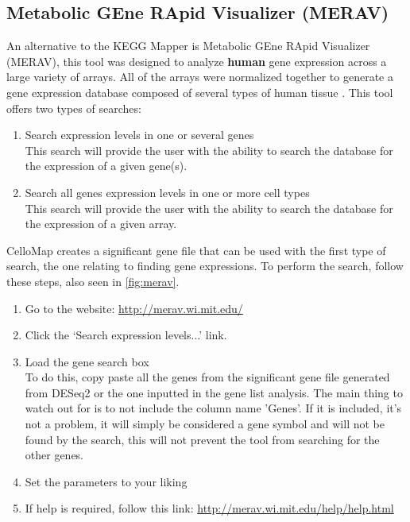 \documentclass[11pt]{article}
\begin{document}
\subsection{Metabolic GEne RApid Visualizer (MERAV)\label{MERAV}}
An alternative to the KEGG Mapper is Metabolic GEne RApid Visualizer (MERAV), this tool was designed to analyze \textbf{human} gene expression across a large variety of arrays. All of the arrays were normalized together to generate a gene expression database composed of several types of human tissue \cite{shaul2015merav}.
This tool offers two types of searches:
\begin{enumerate}
\item Search expression levels in one or several genes\\
This search will provide the user with the ability to search the database for the expression of a given gene(s).
\item Search all genes expression levels in one or more cell types\\
This search will provide the user with the ability to search the database for the expression of a given array.
\end{enumerate}

CelloMap creates a significant gene file that can be used with the first type of search, the one relating to finding gene expressions. To perform the search, follow these steps, also seen in \autoref{fig:merav}.
\begin{enumerate}
\item Go to the website: \url{http://merav.wi.mit.edu/}
\item Click the `Search expression levels...' link.
\item Load the gene search box\\
To do this, copy paste all the genes from the significant gene file generated from DESeq2 or the one inputted in the gene list analysis. The main thing to watch out for is to not include the column name 'Genes'. If it is included, it's not a problem, it will simply be considered a gene symbol and will not be found by the search, this will not prevent the tool from searching for the other genes.
\item Set the parameters to your liking
\item If help is required, follow this link: \url{http://merav.wi.mit.edu/help/help.html}
\end{enumerate}
\end{document}
